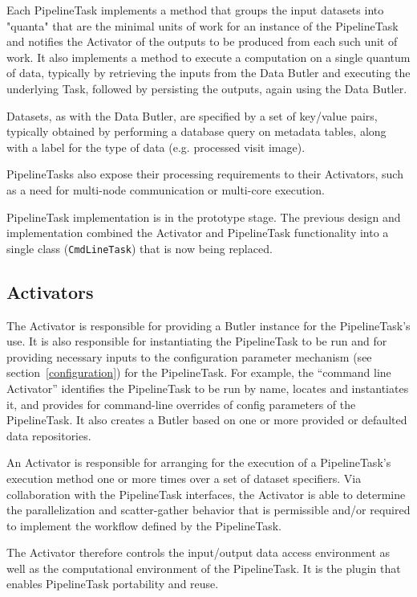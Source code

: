 \documentclass[DM,lsstdraft,toc]{lsstdoc}
\begin{document}
Each PipelineTask implements a method that groups the input datasets into "quanta"
that are the minimal units of work for an instance of the PipelineTask and
notifies the Activator of the outputs to be produced from each such unit of
work.  It also implements a method to execute a computation on a single quantum
of data, typically by retrieving the inputs from the Data Butler and executing
the underlying Task, followed by persisting the outputs, again using the Data
Butler.

Datasets, as with the Data Butler, are specified by a set of key/value pairs,
typically obtained by performing a database query on metadata tables, along
with a label for the type of data (e.g. processed visit image).

PipelineTasks also expose their processing requirements to their Activators, such
as a need for multi-node communication or multi-core execution.

PipelineTask implementation is in the prototype stage.  The previous design and
implementation combined the Activator and PipelineTask functionality into a single
class (\texttt{CmdLineTask}) that is now being replaced.

\subsection{Activators}\label{activators}

The Activator is responsible for providing a Butler instance for the
PipelineTask’s use. It is also responsible for instantiating the PipelineTask to be
run and for providing necessary inputs to the configuration parameter mechanism
(see section~\ref{configuration}) for the PipelineTask. For example, the “command
line Activator” identifies the PipelineTask to be run by name, locates and
instantiates it, and provides for command-line overrides of config parameters
of the PipelineTask. It also creates a Butler based on one or more provided or
defaulted data repositories.

An Activator is responsible for arranging for the execution of a PipelineTask’s
execution method one or more times over a set of dataset specifiers. Via
collaboration with the PipelineTask interfaces, the Activator is able to determine
the parallelization and scatter-gather behavior that is permissible and/or
required to implement the workflow defined by the PipelineTask.

The Activator therefore controls the input/output data access environment as
well as the computational environment of the PipelineTask.  It is the plugin that
enables PipelineTask portability and reuse.
\end{document}
